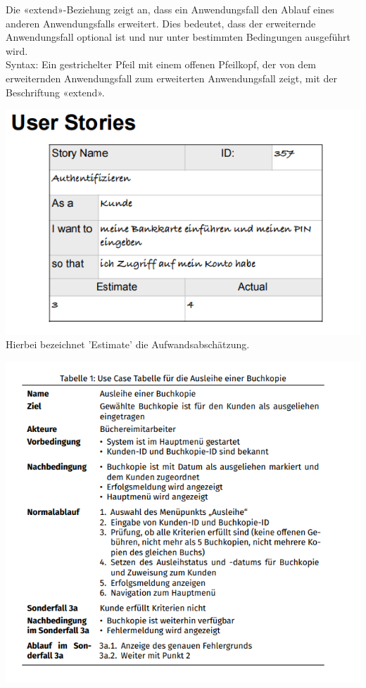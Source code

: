 \documentclass{article}
\begin{document}
\begin{enumerate}[label=\alph*)]
  	Die «extend»-Beziehung zeigt an, dass ein Anwendungsfall den Ablauf eines anderen Anwendungsfalls erweitert. Dies bedeutet, dass der erweiternde Anwendungsfall optional ist und nur unter bestimmten Bedingungen ausgeführt wird.\\
  	Syntax: Ein gestrichelter Pfeil mit einem offenen Pfeilkopf, der von dem erweiternden Anwendungsfall zum erweiterten Anwendungsfall zeigt, mit der Beschriftung «extend».\\
  		
\newpage

  	\includegraphics[scale=1]{media/userStories}\\
  	Hierbei bezeichnet 'Estimate' die Aufwandsabschätzung.
  	
  	\includegraphics[scale=1.2]{media/useCaseTable4}	

\end{enumerate}
\end{document}
